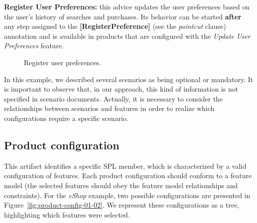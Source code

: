 {\bf Register User Preferences:} this advice updates the user preferences based
on the user's history of searches and purchases. Its behavior can be started {\bf
after} any step assigned to the {\bf [RegisterPreference]} (see the
\emph{pointcut} clause) annotation and is available in products that are
configured with the \emph{Update User Preferences} feature.

\begin{figure}[h]
\caption{Register user preferences.}
\label{fig:register-preferences-flow}
\end{figure}

In this example, we described several scenarios as being optional or
mandatory. It is important to observe that, in our approach, this kind of
information is not specified in scenario documents. Actually, it is necessary to
consider the relationships between scenarios and features in order to realize
which configurations require a specific scenario.



\subsection{Product configuration}\label{subsub:pc}

This artifact identifies a specific SPL member, which is characterized by a valid
configuration of features. Each product configuration should conform to a feature
model (the selected features should obey the feature model relationships and
constraints). For the \emph{eShop} example, two possible configurations are
presented in Figure~\ref{fig:product-config-01-02}. We represent these configurations as a
tree, highlighting which features were selected.


